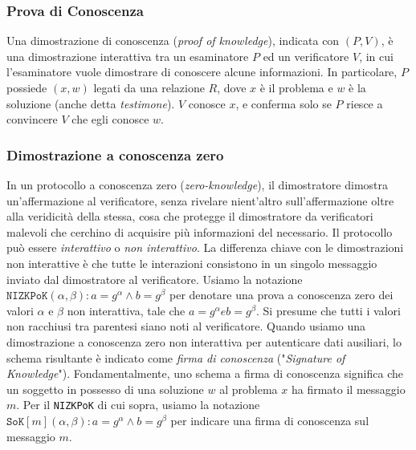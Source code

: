 \subsubsection{Prova di Conoscenza}
Una dimostrazione di conoscenza (\emph{proof of knowledge}), indicata con $(P, V)$, è una dimostrazione interattiva tra un esaminatore $P$ ed un verificatore $V$, in cui l'esaminatore vuole dimostrare di conoscere alcune informazioni. In particolare, $P$ possiede $(x, w)$ legati da una relazione $R$, dove $x$ è il problema e $w$ è la soluzione (anche detta \emph{testimone}). $V$ conosce $x$, e conferma solo se $P$ riesce a convincere $V$ che egli conosce $w$.

\subsubsection{Dimostrazione a conoscenza zero}
In un protocollo a conoscenza zero (\emph{zero-knowledge}), il dimostratore dimostra un'affermazione al verificatore, senza rivelare nient'altro sull'affermazione oltre alla veridicità della stessa, cosa che protegge il dimostratore da verificatori malevoli che cerchino di acquisire più informazioni del necessario. Il protocollo può essere \emph{interattivo} o \emph{non interattivo}. La differenza chiave con le dimostrazioni non interattive è che tutte le interazioni consistono in un singolo messaggio inviato dal dimostratore al verificatore. Usiamo la notazione $\texttt{NIZKPoK}(\alpha, \beta): a = g^{\alpha} \wedge b = g^{\beta}$ per denotare una prova a conoscenza zero dei valori $\alpha$ e $\beta$ non interattiva, tale che $a = g^{\alpha} e b = g^{\beta}$. Si presume che tutti i valori non racchiusi tra parentesi siano noti al verificatore. Quando usiamo una dimostrazione a conoscenza zero non interattiva per autenticare dati ausiliari, lo schema risultante è indicato come \emph{firma di conoscenza} ("\emph{Signature of Knowledge}")\cite{c8}. Fondamentalmente, uno schema a firma di conoscenza significa che un soggetto in possesso di una soluzione $w$ al problema $x$ ha firmato il messaggio $m$. Per il \texttt{NIZKPoK} di cui sopra, usiamo la notazione $\texttt{SoK}[m](\alpha, \beta): a = g^{\alpha} \wedge b = g^{\beta}$ per indicare una firma di conoscenza sul messaggio $m$.

